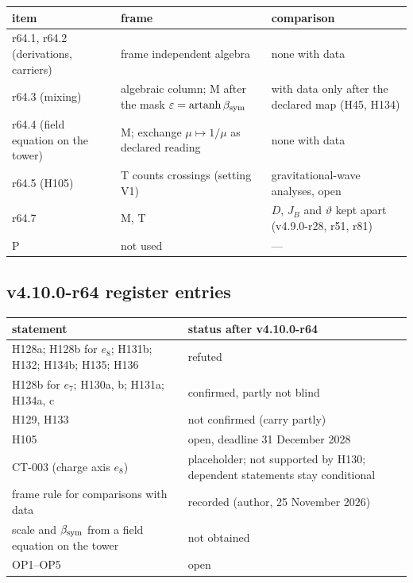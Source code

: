 \begin{center}
\small
\begin{tabular}{@{}>{\raggedright\arraybackslash}p{}>{\raggedright\arraybackslash}p{}>{\raggedright\arraybackslash}p{}@{}}
\toprule
item & frame & comparison\\
\midrule
r64.1, r64.2 (derivations, carriers) & frame independent algebra & none with data\\
r64.3 (mixing) & algebraic column; M after the mask \(\varepsilon=\operatorname{artanh}\beta_{\rm sym}\) & with data only after the declared map (H45, H134)\\
r64.4 (field equation on the tower) & M; exchange \(\mu\mapsto1/\mu\) as declared reading & none with data\\
r64.5 (H105) & T counts crossings (setting V1) & gravitational-wave analyses, open\\
r64.7 & M, T & \(D\), \(J_B\) and \(\vartheta\) kept apart (v4.9.0-r28, r51, r81)\\
P & not used & ---\\
\bottomrule
\end{tabular}
\end{center}

\subsection*{v4.10.0-r64 register entries}
\label{subsec:v4100-r64-register}

\begin{center}
\small
\begin{tabular}{@{}>{\raggedright\arraybackslash}p{}>{\raggedright\arraybackslash}p{}@{}}
\toprule
statement & status after v4.10.0-r64\\
\midrule
H128a; H128b for \(e_8\); H131b; H132; H134b; H135; H136 & refuted\\
H128b for \(e_7\); H130a, b; H131a; H134a, c & confirmed, partly not blind\\
H129, H133 & not confirmed (carry partly)\\
H105 & open, deadline 31 December 2028\\
CT-003 (charge axis \(e_8\)) & placeholder; not supported by H130; dependent statements stay conditional\\
frame rule for comparisons with data & recorded (author, 25 November 2026)\\
scale and \(\beta_{\rm sym}\) from a field equation on the tower & not obtained\\
OP1--OP5 & open\\
\bottomrule
\end{tabular}
\end{center}

